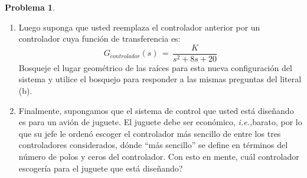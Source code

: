 \documentclass[ a4paper, twoside, 11pt]{article}
\newcommand{\define}{\triangleq}
\newcommand{\ie}{\textit{i.e.,\;}}
\theoremstyle{definition}
\newtheorem{problem}[definition]{Problema}
\begin{document}
\begin{problem}
\begin{enumerate}[label=\alph*.]
\item Luego suponga que usted reemplaza el controlador anterior por un controlador cuya funci\'on de transferencia es:
\[
G_{controlador}(s) \, = \, \frac{K}{s^2 + 8s + 20}
\]
Bosqueje el lugar geom\'etrico de las ra\'ices para esta nueva configuraci\'on del sistema y utilice el bosquejo para responder a las mismas preguntas del literal (b). 
\item Finalmente, supongamos que el sistema de control que usted est\'a dise\~nando es para un avi\'on de juguete. El juguete debe ser econ\'omico, \ie barato, por lo que su jefe le orden\'o escoger el controlador m\'as sencillo de entre los tres controladores considerados, d\'onde ``m\'as sencillo'' se define en t\'erminos del n\'umero de polos y ceros del controlador. Con esto en mente, cu\'al controlador escoger\'ia para el juguete que est\'a dise\~nando? 

\end{enumerate}

\end{problem}
\vspace{\baselineskip}

%
%
\end{document}
